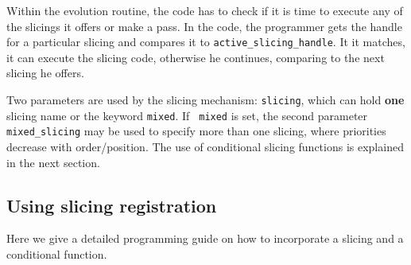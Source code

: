 \documentclass{article}
\begin{document}
Within the evolution routine, the code has to check if it is time to
execute any of the slicings it offers or make a pass. In the code, the 
programmer gets the handle for a particular slicing and compares it
to {\tt active\_slicing\_handle}. It it matches, it can execute the
slicing code, otherwise he continues, comparing to the next slicing he offers.

Two parameters are used by the slicing mechanism: {\tt slicing}, which 
can hold {\bf one} slicing name or the keyword {\tt mixed}. If {\tt
mixed} is set, the second parameter {\tt mixed\_slicing} may be used to 
specify more than one slicing, where priorities decrease with order/position.
The use of conditional slicing functions is explained in the next section.


\subsection{Using slicing registration}
Here we give a detailed programming guide on how to incorporate a slicing and 
a conditional function.
\end{document}
